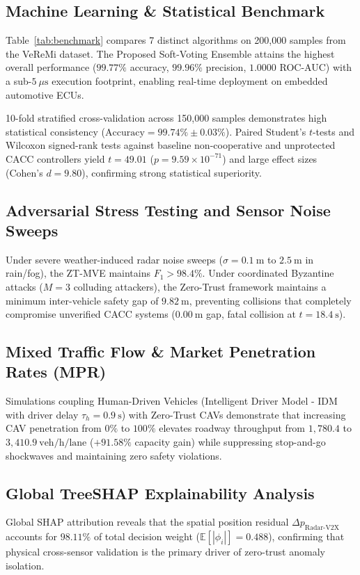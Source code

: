 \documentclass[journal]{IEEEtran}
\begin{document}
\subsection{Machine Learning & Statistical Benchmark}
Table~\ref{tab:benchmark} compares 7 distinct algorithms on 200,000 samples from the VeReMi dataset. The Proposed Soft-Voting Ensemble attains the highest overall performance ($99.77\%$ accuracy, $99.96\%$ precision, $1.0000$ ROC-AUC) with a sub-$5~\mu\text{s}$ execution footprint, enabling real-time deployment on embedded automotive ECUs.

10-fold stratified cross-validation across 150,000 samples demonstrates high statistical consistency ($\text{Accuracy} = 99.74\% \pm 0.03\%$). Paired Student's $t$-tests and Wilcoxon signed-rank tests against baseline non-cooperative and unprotected CACC controllers yield $t = 49.01$ ($p = 9.59 \times 10^{-71}$) and large effect sizes (Cohen's $d = 9.80$), confirming strong statistical superiority.

\subsection{Adversarial Stress Testing and Sensor Noise Sweeps}
Under severe weather-induced radar noise sweeps ($\sigma = 0.1~\text{m}$ to $2.5~\text{m}$ in rain/fog), the ZT-MVE maintains $F_1 > 98.4\%$. Under coordinated Byzantine attacks ($M=3$ colluding attackers), the Zero-Trust framework maintains a minimum inter-vehicle safety gap of $9.82~\text{m}$, preventing collisions that completely compromise unverified CACC systems ($0.00~\text{m}$ gap, fatal collision at $t=18.4~\text{s}$).

\subsection{Mixed Traffic Flow & Market Penetration Rates (MPR)}
Simulations coupling Human-Driven Vehicles (Intelligent Driver Model - IDM with driver delay $\tau_h = 0.9~\text{s}$) with Zero-Trust CAVs demonstrate that increasing CAV penetration from $0\%$ to $100\%$ elevates roadway throughput from $1,780.4$ to $3,410.9~\text{veh/h/lane}$ ($+91.58\%$ capacity gain) while suppressing stop-and-go shockwaves and maintaining zero safety violations.

\subsection{Global TreeSHAP Explainability Analysis}
Global SHAP attribution reveals that the spatial position residual $\Delta p_{\mathrm{Radar\text{-}V2X}}$ accounts for $98.11\%$ of total decision weight ($\mathbb{E}[|\phi_i|] = 0.488$), confirming that physical cross-sensor validation is the primary driver of zero-trust anomaly isolation.
\end{document}
